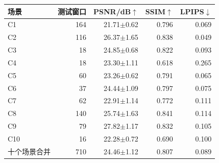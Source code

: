 \begin{tabular}{@{}lrrrr@{}}
\toprule
场景 & 测试窗口 & PSNR/dB$\uparrow$ & SSIM$\uparrow$ & LPIPS$\downarrow$\\
\midrule
C1 & 164 & 21.71$\pm$0.62 & 0.796 & 0.069 \\
C2 & 116 & 26.37$\pm$1.65 & 0.838 & 0.049 \\
C3 & 18 & 24.85$\pm$0.68 & 0.822 & 0.093 \\
C4 & 18 & 23.30$\pm$1.11 & 0.618 & 0.265 \\
C5 & 60 & 23.26$\pm$0.62 & 0.791 & 0.065 \\
C6 & 37 & 24.44$\pm$1.09 & 0.797 & 0.075 \\
C7 & 62 & 22.91$\pm$1.14 & 0.772 & 0.111 \\
C8 & 140 & 25.74$\pm$1.63 & 0.841 & 0.114 \\
C9 & 79 & 27.82$\pm$1.17 & 0.832 & 0.105 \\
C10 & 16 & 22.28$\pm$0.72 & 0.690 & 0.100 \\
\midrule
十个场景合并 & 710 & 24.46$\pm$1.12 & 0.807 & 0.089 \\
\bottomrule
\end{tabular}
